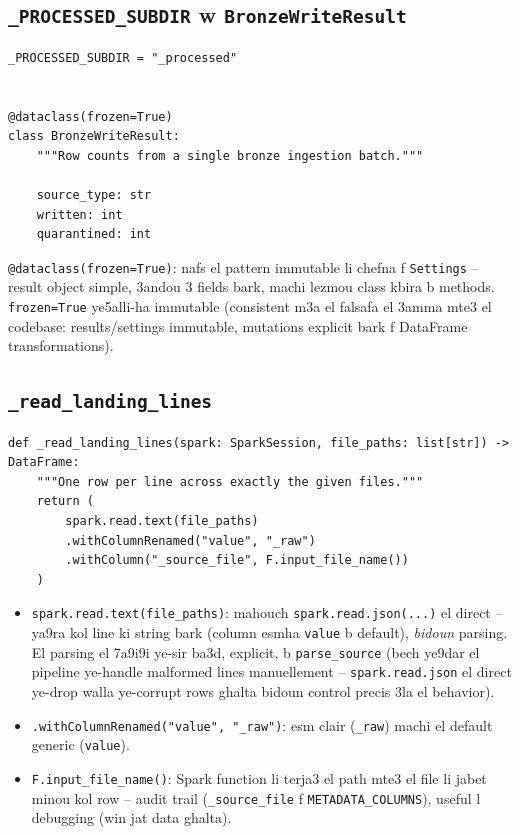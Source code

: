 \documentclass[11pt,a4paper]{report}
\DeclareRobustCommand{\code}[1]{\texttt{#1}}
\begin{document}
\subsection{\code{\_PROCESSED\_SUBDIR} w \code{BronzeWriteResult}}

\begin{lstlisting}[style=pystyle]
_PROCESSED_SUBDIR = "_processed"


@dataclass(frozen=True)
class BronzeWriteResult:
    """Row counts from a single bronze ingestion batch."""

    source_type: str
    written: int
    quarantined: int
\end{lstlisting}

\code{@dataclass(frozen=True)}: nafs el pattern immutable li chefna f
\code{Settings} -- result object simple, 3andou 3 fields bark, machi
lezmou class kbira b methods. \code{frozen=True} ye5alli-ha immutable
(consistent m3a el falsafa el 3amma mte3 el codebase: results/settings
immutable, mutations explicit bark f DataFrame transformations).

\subsection{\code{\_read\_landing\_lines}}

\begin{lstlisting}[style=pystyle]
def _read_landing_lines(spark: SparkSession, file_paths: list[str]) -> DataFrame:
    """One row per line across exactly the given files."""
    return (
        spark.read.text(file_paths)
        .withColumnRenamed("value", "_raw")
        .withColumn("_source_file", F.input_file_name())
    )
\end{lstlisting}

\begin{itemize}
  \item \code{spark.read.text(file\_paths)}: mahouch \code{spark.read.json(...)}
        el direct -- ya9ra kol line ki string bark (column esmha
        \code{value} b default), \emph{bidoun} parsing. El parsing el
        7a9i9i ye-sir ba3d, explicit, b \code{parse\_source} (bech ye9dar
        el pipeline ye-handle malformed lines manuellement -- \code{spark.read.json}
        el direct ye-drop walla ye-corrupt rows ghalta bidoun control
        precis 3la el behavior).
  \item \code{.withColumnRenamed("value", "\_raw")}: esm clair (\code{\_raw})
        machi el default generic (\code{value}).
  \item \code{F.input\_file\_name()}: Spark function li terja3 el path
        mte3 el file li jabet minou kol row -- audit trail (\code{\_source\_file}
        f \code{METADATA\_COLUMNS}), useful l debugging (win jat data
        ghalta).
\end{itemize}
\end{document}
